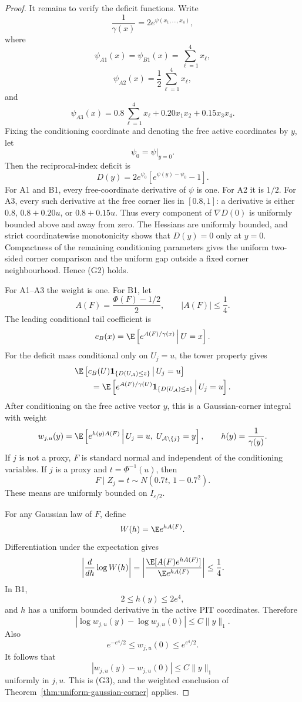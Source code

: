 \begin{proof}
It remains to verify the deficit functions. Write
\[
 \frac1{\gamma(x)}=2e^{\psi(x_1,\ldots,x_4)},
\]
where
\[
 \psi_{A1}(x)=\psi_{B1}(x)=\sum_{\ell=1}^4x_\ell,
\]
\[
 \psi_{A2}(x)=\frac12\sum_{\ell=1}^4x_\ell,
\]
and
\[
 \psi_{A3}(x)
 =
 0.8\sum_{\ell=1}^4x_\ell
 +0.20x_1x_2+0.15x_3x_4.
\]
Fixing the conditioning coordinate and denoting the free active
coordinates by \(y\), let
\[
 \psi_0=\psi\big|_{y=0}.
\]
Then the reciprocal-index deficit is
\begin{equation}
 D(y)
 =
 2e^{\psi_0}
 \left[
  e^{\psi(y)-\psi_0}-1
 \right].
 \label{eq:model-deficit-form}
\end{equation}
For A1 and B1, every free-coordinate derivative of \(\psi\) is
one. For A2 it is \(1/2\). For A3, every such derivative at the
free corner lies in \([0.8,1]\): a derivative is either \(0.8\),
\(0.8+0.20u\), or \(0.8+0.15u\). Thus every component of
\(\nabla D(0)\) is uniformly bounded above and away from zero.
The Hessians are uniformly bounded, and strict coordinatewise
monotonicity shows that \(D(y)=0\) only at \(y=0\). Compactness
of the remaining conditioning parameters gives the uniform
two-sided corner comparison and the uniform gap outside a fixed
corner neighbourhood. Hence (G2) holds.

For A1--A3 the weight is one. For B1, let
\[
 A(F)=\frac{\Phi(F)-1/2}{2},
 \qquad |A(F)|\le\frac14.
\]
The leading conditional tail coefficient is
\[
 c_B(x)=
 \E\left[
  e^{A(F)/\gamma(x)}
  \,\middle|\,U=x
 \right].
\]
For the deficit mass conditional only on \(U_j=u\), the tower
property gives
\begin{align}
 &\E\left[
  c_B(U)\mathbf 1_{\{D(U_{\mathcal A})\le z\}}
  \,\middle|\,U_j=u
 \right]
 \nonumber\\
 &\qquad=
 \E\left[
  e^{A(F)/\gamma(U)}
  \mathbf 1_{\{D(U_{\mathcal A})\le z\}}
  \,\middle|\,U_j=u
 \right].
 \label{eq:B1-weight-tower}
\end{align}
After conditioning on the free active vector \(y\), this is a
Gaussian-corner integral with weight
\[
 w_{j,u}(y)
 =
 \E\left[
  e^{h(y)A(F)}
  \,\middle|\,U_j=u,\;U_{\mathcal A\setminus\{j\}}=y
 \right],
 \qquad
 h(y)=\frac1{\gamma(y)}.
\]
If \(j\) is not a proxy, \(F\) is standard normal and independent
of the conditioning variables. If \(j\) is a proxy and
\(t=\Phi^{-1}(u)\), then
\[
 F\mid Z_j=t\sim N(0.7t,\,1-0.7^2).
\]
These means are uniformly bounded on \(I_{\varepsilon/2}\).

For any Gaussian law of \(F\), define
\[
 W(h)=\E e^{hA(F)}.
\]
Differentiation under the expectation gives
\[
 \left|\frac{d}{dh}\log W(h)\right|
 =
 \left|
 \frac{\E[A(F)e^{hA(F)}]}{\E e^{hA(F)}}
 \right|
 \le\frac14.
\]
In B1,
\[
 2\le h(y)\le2e^4,
\]
and \(h\) has a uniform bounded derivative in the active PIT
coordinates. Therefore
\[
 |\log w_{j,u}(y)-\log w_{j,u}(0)|
 \le C\|y\|_1.
\]
Also
\[
 e^{-e^4/2}\le w_{j,u}(0)\le e^{e^4/2}.
\]
It follows that
\[
 |w_{j,u}(y)-w_{j,u}(0)|\le C\|y\|_1
\]
uniformly in \(j,u\). This is (G3), and the weighted conclusion
of Theorem~\ref{thm:uniform-gaussian-corner} applies.
\end{proof}


